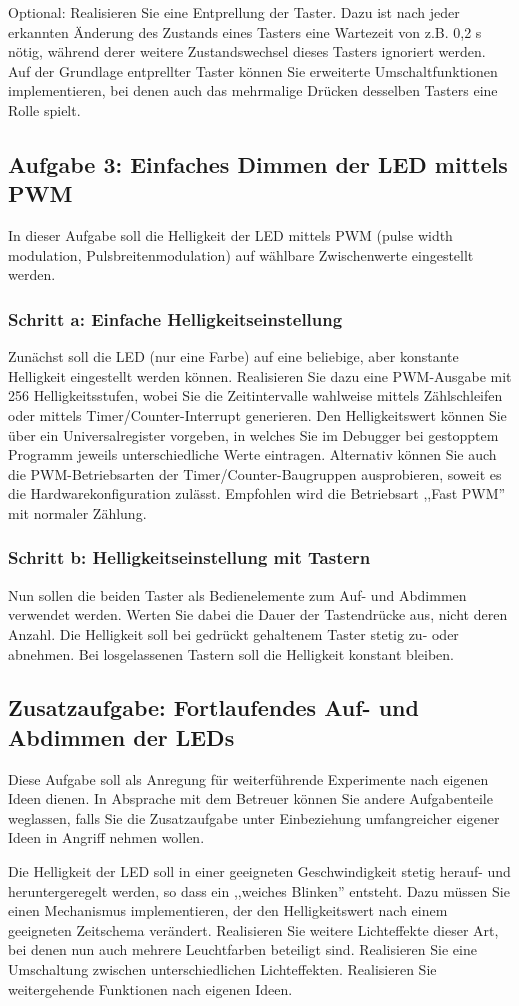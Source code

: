 \documentclass[a4paper,12pt,titlepage]{scrartcl}
\begin{document}
Optional: Realisieren Sie eine Entprellung der Taster. Dazu ist nach jeder erkannten Änderung des Zustands eines Tasters eine Wartezeit von z.B. 0,2 s nötig, während derer weitere Zustandswechsel dieses Tasters ignoriert werden. Auf der Grundlage entprellter Taster können Sie erweiterte Umschaltfunktionen implementieren, bei denen auch das mehrmalige Drücken desselben Tasters eine Rolle spielt.

\subsection*{Aufgabe 3: Einfaches Dimmen der LED mittels PWM}
In dieser Aufgabe soll die Helligkeit der LED mittels PWM (pulse width modulation, Pulsbreitenmodulation) auf wählbare Zwischenwerte eingestellt werden.

\subsubsection*{Schritt a: Einfache Helligkeitseinstellung}
Zunächst soll die LED (nur eine Farbe) auf eine beliebige, aber konstante Helligkeit eingestellt werden können. Realisieren Sie dazu eine PWM-Ausgabe mit 256 Helligkeitsstufen, wobei Sie die Zeitintervalle wahlweise mittels Zählschleifen oder mittels Timer/Counter-Interrupt generieren. Den Helligkeitswert können Sie über ein Universalregister vorgeben, in welches Sie im Debugger bei gestopptem Programm jeweils unterschiedliche Werte eintragen.
Alternativ können Sie auch die PWM-Betriebsarten der Timer/Counter-Baugruppen ausprobieren, soweit es die Hardwarekonfiguration zulässt. Empfohlen wird die Betriebsart ,,Fast PWM'' mit normaler Zählung.

\subsubsection*{Schritt b: Helligkeitseinstellung mit Tastern}
Nun sollen die beiden Taster als Bedienelemente zum Auf- und Abdimmen verwendet werden. Werten Sie dabei die Dauer der Tastendrücke aus, nicht deren Anzahl. Die Helligkeit soll bei gedrückt gehaltenem Taster stetig zu- oder abnehmen. Bei losgelassenen Tastern soll die Helligkeit konstant bleiben.

\subsection*{Zusatzaufgabe: Fortlaufendes Auf- und Abdimmen der LEDs}
Diese Aufgabe soll als Anregung für weiterführende Experimente nach eigenen Ideen dienen. In Absprache mit dem Betreuer können Sie andere Aufgabenteile weglassen, falls Sie die Zusatzaufgabe unter Einbeziehung umfangreicher eigener Ideen in Angriff nehmen wollen.

Die Helligkeit der LED soll in einer geeigneten Geschwindigkeit stetig herauf- und heruntergeregelt werden, so dass ein ,,weiches Blinken'' entsteht. Dazu müssen Sie einen Mechanismus implementieren, der den Helligkeitswert nach einem geeigneten Zeitschema verändert.
Realisieren Sie weitere Lichteffekte dieser Art, bei denen nun auch mehrere Leuchtfarben beteiligt sind.
Realisieren Sie eine Umschaltung zwischen unterschiedlichen Lichteffekten.
Realisieren Sie weitergehende Funktionen nach eigenen Ideen.
\end{document}
